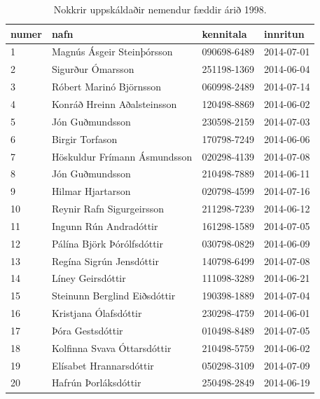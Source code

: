 \begin{table}
\centering
\caption[Nemendur]{Nokkrir uppskáldaðir nemendur fæddir árið 1998.}
\label{tafla:nemendur}
\begin{tabular}{llll}
\toprule
numer&nafn&kennitala&innritun\\
\midrule
1&Magnús Ásgeir Steinþórsson&090698-6489& 2014-07-01\\
2&Sigurður Ómarsson&251198-1369& 2014-06-04\\
3&Róbert Marinó Björnsson&060998-2489& 2014-07-14\\
4&Konráð Hreinn Aðalsteinsson&120498-8869& 2014-06-02\\
5&Jón Guðmundsson&230598-2159& 2014-07-03\\
6&Birgir Torfason&170798-7249& 2014-06-06\\
7&Höskuldur Frímann Ásmundsson&020298-4139& 2014-07-08\\
8&Jón Guðmundsson&210498-7889& 2014-06-11\\
9&Hilmar Hjartarson&020798-4599& 2014-07-16\\
10&Reynir Rafn Sigurgeirsson&211298-7239& 2014-06-12\\
11&Ingunn Rún Andradóttir&161298-1589& 2014-07-05\\
12&Pálína Björk Þórólfsdóttir&030798-0829& 2014-06-09\\
13&Regína Sigrún Jensdóttir&140798-6499& 2014-07-08\\
14&Líney Geirsdóttir&111098-3289& 2014-06-21\\
15&Steinunn Berglind Eiðsdóttir&190398-1889& 2014-07-04\\
16&Kristjana Ólafsdóttir&230298-4759& 2014-06-01\\
17&Þóra Gestsdóttir&010498-8489& 2014-07-05\\
18&Kolfinna Svava Óttarsdóttir&210498-5759& 2014-06-02\\
19&Elísabet Hrannarsdóttir&050298-3109& 2014-07-09\\
20&Hafrún Þorláksdóttir&250498-2849& 2014-06-19\\
\bottomrule
\end{tabular}
\end{table}

\begin{example}
\caption[SELECT FROM]{\emph{SELECT} skipun með \emph{FROM} klausu. Hún velur allan ``nafn'' dálkinn úr töflunni Nemendur (\ref{tafla:nemendur}).}
\label{sql:k4d2-from}
\centering
{}
\end{example}

